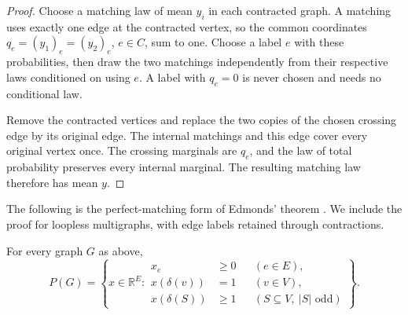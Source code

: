 \begin{proof}
Choose a matching law of mean $y_i$ in each contracted graph.
A matching uses exactly one edge at the contracted vertex, so the
common coordinates $q_e=(y_1)_e=(y_2)_e$, $e\in C$, sum to one.
Choose a label $e$ with these probabilities, then draw the two
matchings independently from their respective laws conditioned on
using $e$. A label with $q_e=0$ is never chosen and needs no
conditional law.

Remove the contracted vertices and replace the two copies of the
chosen crossing edge by its original edge. The internal matchings
and this edge cover every original vertex once. The crossing
marginals are $q_e$, and the law of total probability preserves every
internal marginal. The resulting matching law therefore has mean $y$.
\end{proof}

The following is the perfect-matching form of Edmonds' theorem
\citep[Section~2, Theorem~(P)]{Edmonds1965}. We include the proof for
loopless multigraphs, with edge labels retained through contractions.

\begin{theorem}
\label{geom:thm-polytope}
For every graph \(G\) as above,
\begin{equation}
\label{geom:eq-polytope}
 P(G)=\left\{x\in\mathbb R^E:
 \begin{aligned}
 x_e&\ge0 &&(e\in E),\\
 x(\delta(v))&=1 &&(v\in V),\\
 x(\delta(S))&\ge1 &&(S\subseteq V,\ |S|\text{ odd})
 \end{aligned}\right\}.
\end{equation}
\end{theorem}

